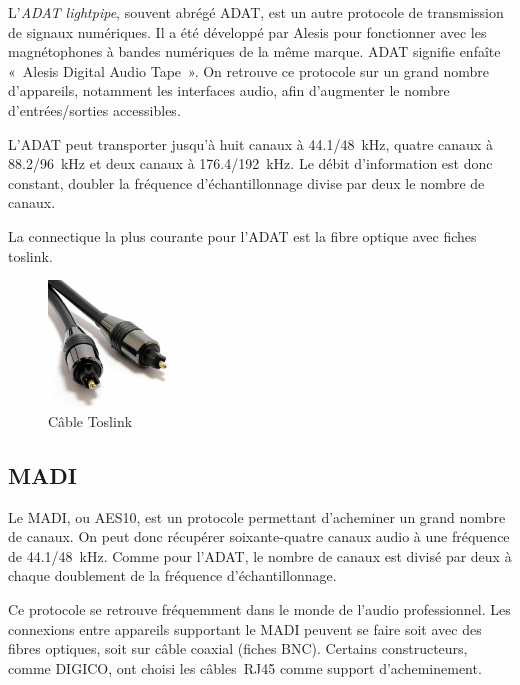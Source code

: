 \documentclass[
  letterpaper,
  DIV=11,
  numbers=noendperiod]{scrreprt}
\begin{document}
L'\emph{ADAT lightpipe}, souvent abrégé ADAT, est un autre protocole de
transmission de signaux numériques. Il a été développé par Alesis pour
fonctionner avec les magnétophones à bandes numériques de la même
marque. ADAT signifie enfaîte «~Alesis Digital Audio Tape~». On retrouve
ce protocole sur un grand nombre d'appareils, notamment les interfaces
audio, afin d'augmenter le nombre d'entrées/sorties accessibles.

L'ADAT peut transporter jusqu'à huit canaux à 44.1/48~kHz, quatre canaux
à 88.2/96~kHz et deux canaux à 176.4/192~kHz. Le débit d'information est
donc constant, doubler la fréquence d'échantillonnage divise par deux le
nombre de canaux.

La connectique la plus courante pour l'ADAT est la fibre optique avec
fiches toslink.

\begin{figure}

{\centering \includegraphics[width=0.3\textwidth,height=\textheight]{outils_equipements/../_resources/bitmap/plug/toslink.jpg}

}

\caption{\label{fig-toslink}Câble Toslink}

\end{figure}

\hypertarget{madi}{%
\subsection{MADI}\label{madi}}

Le MADI, ou AES10, est un protocole permettant d'acheminer un grand
nombre de canaux. On peut donc récupérer soixante-quatre canaux audio à
une fréquence de 44.1/48~kHz. Comme pour l'ADAT, le nombre de canaux est
divisé par deux à chaque doublement de la fréquence d'échantillonnage.

Ce protocole se retrouve fréquemment dans le monde de l'audio
professionnel. Les connexions entre appareils supportant le MADI peuvent
se faire soit avec des fibres optiques, soit sur câble coaxial (fiches
BNC). Certains constructeurs, comme DIGICO, ont choisi les câbles~RJ45
comme support d'acheminement.
\end{document}
